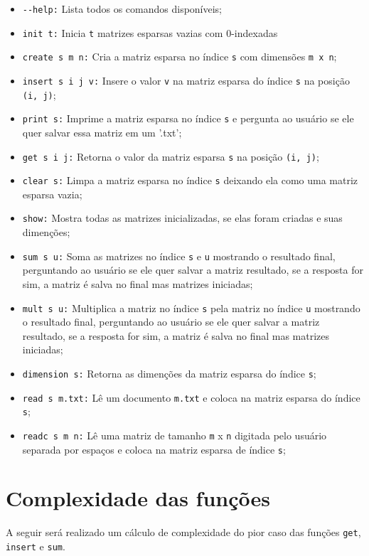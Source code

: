 \documentclass[12pt]{article}
\begin{document}
\begin{itemize}
    \item \verb|--help:| Lista todos os comandos disponíveis;
    \item \verb|init t:| Inicia \verb|t| matrizes esparsas vazias com 0-indexadas 
    \item \verb|create s m n:| Cria a matriz esparsa no índice \verb|s| com dimensões \verb|m x n|;
    \item \verb|insert s i j v:| Insere o valor \verb|v| na matriz esparsa do índice \verb|s| na posição \verb|(i, j)|;
    \item \verb|print s:| Imprime a matriz esparsa no índice \verb|s| e pergunta ao usuário se ele quer salvar essa matriz em um '.txt';
    \item \verb|get s i j:| Retorna o valor da matriz esparsa \verb|s| na posição \verb|(i, j)|;
    \item \verb|clear s:| Limpa a matriz esparsa no índice \verb|s| deixando ela como uma matriz esparsa vazia;
    \item \verb|show:| Mostra todas as matrizes inicializadas, se elas foram criadas e suas dimenções;
    \item \verb|sum s u:| Soma as matrizes no índice \verb|s| e \verb|u| mostrando o resultado final, perguntando ao usuário se ele quer salvar a matriz resultado, se a resposta for sim, a matriz é salva no final mas matrizes iniciadas;
    \item \verb|mult s u:| Multiplica a matriz no índice \verb|s| pela matriz no índice \verb|u| mostrando o resultado final, perguntando ao usuário se ele quer salvar a matriz resultado, se a resposta for sim, a matriz é salva no final mas matrizes iniciadas;
    \item \verb|dimension s:| Retorna as dimenções da matriz esparsa do índice \verb|s|;
    \item \verb|read s m.txt:| Lê um documento \verb|m.txt| e coloca na matriz esparsa do índice \verb|s|;
    \item \verb|readc s m n:| Lê uma matriz de tamanho \verb|m| x \verb|n| digitada pelo usuário separada por espaços e coloca na matriz esparsa de índice \verb|s|;
    
\end{itemize}

\section{Complexidade das funções}
A seguir será realizado um cálculo de complexidade do pior caso das funções \verb|get|, \verb|insert| e \verb|sum|.
\end{document}
